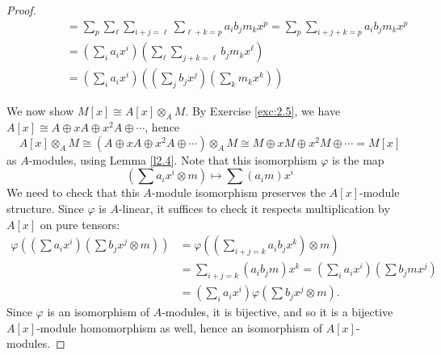 \documentclass[12pt,letterpaper]{article}
\theoremstyle{definition}
\theoremstyle{remark}
\numberwithin{figure}{problem}
\numberwithin{equation}{section}
\begin{document}
\begin{proof}
\begin{align*}
    &%
    \qquad\qquad= \sum_p \sum_\ell \sum_{i+j=\ell} \sum_{\ell+k=p} a_ib_jm_kx^p = \sum_p \sum_{i+j+k=p} a_ib_jm_kx^p\\
    &%
    \qquad\qquad= \left( \sum_i a_ix^i \right) \left( \sum_\ell \sum_{j+k=\ell} b_jm_kx^\ell \right)\\
    &%
    \qquad\qquad= \left( \sum_i a_ix^i \right) \left( \left(\sum_j b_jx^j \right)\left( \sum_k m_kx^k \right) \right)
  \end{align*}
  \par We now show
  $M[x] \cong A[x] \otimes_A
  M$.
  By Exercise \ref{exc:2.5}, we have
  $A[x] \cong A \oplus xA \oplus x^2A \oplus
  \cdots$, hence
  \begin{equation*}
    A[x] \otimes_A M \cong (A \oplus xA \oplus x^2A \oplus \cdots) \otimes_A M \cong M \oplus xM \oplus x^2M \oplus \cdots = M[x]
  \end{equation*}
  as
  $A$-modules, using Lemma \ref{l2.4}.
  Note that this isomorphism
  $\varphi$ is the map 
  \begin{equation*}
    \left(\sum a_ix^i \otimes m\right) \mapsto \sum (a_im)x^i
  \end{equation*}
  We need to check that this
  $A$-module isomorphism preserves the
  $A[x]$-module structure.
  Since
  $\varphi$ is
  $A$-linear, it suffices to check it respects multiplication by
  $A[x]$ on pure tensors:
  \begin{align*}
    \varphi\left(\left(\sum a_ix^i\right)\left(\sum b_jx^j \otimes m\right)\right) &%
    = \varphi\left(\left( \sum_{i+j=k} a_ib_jx^k \right) \otimes m\right)\\
    &%
    = \sum_{i+j=k} (a_ib_jm)x^k = \left(\sum_i a_ix^i\right)\left(\sum b_jmx^j\right)\\
    &%
    = \left(\sum_i a_ix^i\right) \varphi\left( \sum b_jx^j \otimes m \right).
  \end{align*}
  Since
  $\varphi$ is an isomorphism of
  $A$-modules, it is bijective, and so it is a bijective
  $A[x]$-module homomorphism as well, hence an isomorphism of
  $A[x]$-modules.

\end{proof}
\end{document}
